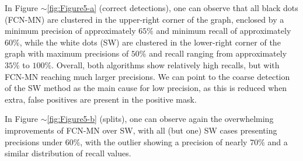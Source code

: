 \documentclass[a4paper,authoryear,review]{elsarticle}
\begin{document}
	In Figure $\sim$\ref{fig:Figure5-a} (correct detections), one can observe that all black dots (FCN-MN) are clustered in the upper-right corner of the graph, enclosed by a minimum precision of approximately $65\%$ and minimum recall of approximately $60\%$, while the white dots (SW) are clustered in the lower-right corner of the graph with maximum precisions of $50\%$ and recall ranging from approximately $35\%$ to $100\%$. Overall, both algorithms show relatively high recalls, but with FCN-MN reaching much larger precisions. We can point to the coarse detection of the SW method as the main cause for low precision, as this is reduced when extra, false positives are present in the positive mask. 
	
	In Figure $\sim$\ref{fig:Figure5-b} (splits), one can observe again the overwhelming improvements of FCN-MN over SW, with all (but one) SW cases presenting precisions under $60\%$, with the outlier showing a precision of nearly  $70\%$ and a similar distribution of recall values.  
	
	
	
\end{document}
